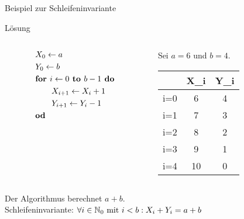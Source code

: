 \begin{frame}{Beispiel zur Schleifeninvariante}
	\begin{block}{Lösung}
		\begin{columns}
			\begin{column}{0.4\textwidth}
				\begin{align*}
				&X_0 \leftarrow a\\
				&Y_0 \leftarrow b\\
				&\text{\textbf{for }} i \leftarrow 0 \text{\textbf{ to }} b-1 \text{\textbf{ do}}\\
				&\qquad X_{i+1} \leftarrow X_{i} + 1\\
				&\qquad Y_{i+1} \leftarrow Y_{i} - 1\\
				&\text{\textbf{od}}
				\end{align*}
			\end{column}

			\begin{column}{0.6\textwidth}
		\begin{center}
		Sei $a=6$ und $b=4$.\\[18pt]
		\begin{tabular}{C C C}
			 &X_i&Y_i\\
			\hline
			i=0&6&4 \\
			i=1&7&3 \\
			i=2&8&2\\
			i=3&9&1\\
			i=4&10&0\\ 
		\end{tabular}\end{center}
			\end{column}
			
		\end{columns}
		Der Algorithmus berechnet $a+b$.\\
		Schleifeninvariante: $\forall i \in \mathbb{N}_0 \text{ mit } i<b: X_i + Y_i = a+b$
	\end{block}
\end{frame}

